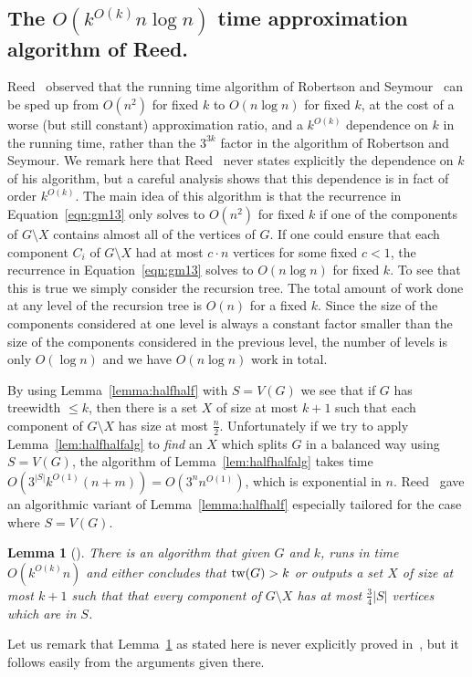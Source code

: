 \documentclass[a4paper,11pt]{article}
\newtheorem{lemma}{Lemma}[section]
\theoremstyle{definition}
\theoremstyle{remark}
\begin{document}
\subsection{The $O(k^{O(k)}n\log n)$ time approximation algorithm of
  Reed.}\label{sec:reedAlg}
Reed~\cite{Reed92} observed that the running time algorithm of
Robertson and Seymour~\cite{RobertsonS13} can be sped up from $O(n^2)$
for fixed $k$ to $O(n \log n)$ for fixed $k$, at the cost of a worse
(but still constant) approximation ratio, and a $k^{O(k)}$ dependence
on $k$ in the running time, rather than the ${3}^{3k}$ factor in the
algorithm of Robertson and Seymour.  We remark here that
Reed~\cite{Reed92} never states explicitly the dependence on $k$ of
his algorithm, but a careful analysis shows that this dependence is in
fact of order $k^{O(k)}$.  The main idea of this algorithm is that the
recurrence in Equation~\ref{eqn:gm13} only solves to $O(n^2)$ for
fixed $k$ if one of the components of $G \setminus X$ contains almost
all of the vertices of $G$.  If one could ensure that each component
$C_i$ of $G \setminus X$ had at most $c \cdot n$ vertices for some
fixed $c < 1$, the recurrence in Equation~\ref{eqn:gm13} solves to
$O(n \log n)$ for fixed $k$.  To see that this is true we simply
consider the recursion tree.  The total amount of work done at any
level of the recursion tree is $O(n)$ for a fixed $k$.  Since the size
of the components considered at one level is always a constant factor
smaller than the size of the components considered in the previous
level, the number of levels is only $O(\log n)$ and we have $O(n \log
n)$ work in total.

By using Lemma~\ref{lemma:halfhalf} with $S = V(G)$ we see that if $G$
has treewidth $\leq k$, then there is a set $X$ of size at most $k+1$
such that each component of $G \setminus X$ has size at most
$\frac{n}{2}$.  Unfortunately if we try to apply
Lemma~\ref{lem:halfhalfalg} to {\em find} an $X$ which splits $G$ in a
balanced way using $S = V(G)$, the algorithm of
Lemma~\ref{lem:halfhalfalg} takes time $O(3^{|S|}k^{O(1)}(n+m)) =
O(3^nn^{O(1)})$, which is exponential in $n$.  Reed~\cite{Reed92} gave
an algorithmic variant of Lemma~\ref{lemma:halfhalf} especially
tailored for the case where $S = V(G)$.

\begin{lemma}[\cite{Reed92}]
  \label{lem:reedBalSep} There is an algorithm that given $G$ and $k$,
  runs in time $O(k^{O(k)}n)$ and either concludes that $\mathrm{tw}(G)>k$ or
  outputs a set $X$ of size at most $k+1$ such that that every
  component of $G \setminus X$ has at most $\frac{3}{4}|S|$ vertices
  which are in $S$.
\end{lemma}
Let us remark that Lemma~\ref{lem:reedBalSep} as stated here is never
explicitly proved in~\cite{Reed92}, but it follows easily from the
arguments given there.
\end{document}
